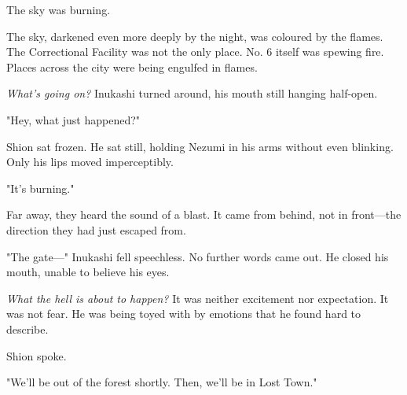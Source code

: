 The sky was burning.

The sky, darkened even more deeply by the night, was coloured by the
flames. The Correctional Facility was not the only place. No. 6 itself
was spewing fire. Places across the city were being engulfed in flames.

\emph{What's going on?} Inukashi turned around, his mouth still hanging
half-open.

"Hey, what just happened?"

Shion sat frozen. He sat still, holding Nezumi in his arms without even
blinking. Only his lips moved imperceptibly.

"\el It's burning."

Far away, they heard the sound of a blast. It came from behind, not in
front---the direction they had just escaped from.

"The gate---" Inukashi fell speechless. No further words came out. He
closed his mouth, unable to believe his eyes.

\emph{What the hell is about to happen?} It was neither excitement nor
expectation. It was not fear. He was being toyed with by emotions that
he found hard to describe.

Shion spoke.

"We'll be out of the forest shortly. Then, we'll be in Lost Town."